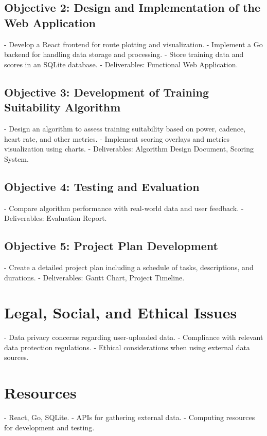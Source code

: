\documentclass{article}
\begin{document}
    \subsection{Objective 2: Design and Implementation of the Web Application}
    - Develop a React frontend for route plotting and visualization.
    - Implement a Go backend for handling data storage and processing.
    - Store training data and scores in an SQLite database.
    - Deliverables: Functional Web Application.

    \subsection{Objective 3: Development of Training Suitability Algorithm}
    - Design an algorithm to assess training suitability based on power, cadence, heart rate, and other metrics.
    - Implement scoring overlays and metrics visualization using charts.
    - Deliverables: Algorithm Design Document, Scoring System.

    \subsection{Objective 4: Testing and Evaluation}
    - Compare algorithm performance with real-world data and user feedback.
    - Deliverables: Evaluation Report.

    \subsection{Objective 5: Project Plan Development}
    - Create a detailed project plan including a schedule of tasks, descriptions, and durations.
    - Deliverables: Gantt Chart, Project Timeline.

    \section{Legal, Social, and Ethical Issues}
    - Data privacy concerns regarding user-uploaded data.
    - Compliance with relevant data protection regulations.
    - Ethical considerations when using external data sources.

    \section{Resources}
    - React, Go, SQLite.
    - APIs for gathering external data.
    - Computing resources for development and testing.
\end{document}
